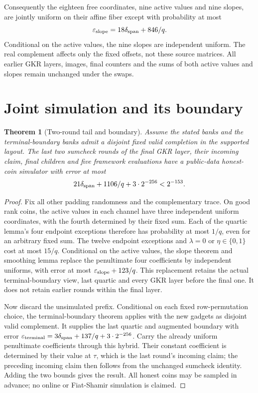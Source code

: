 \documentclass[11pt]{article}
\newtheorem{theorem}[lemma]{Theorem}
\begin{document}
Consequently the eighteen free coordinates, nine active values and nine slopes, are jointly uniform on their affine fiber except with probability at most
\[
 \varepsilon_{\rm slope}=18\delta_{\rm span}+846/q.
\]
Conditional on the active values, the nine slopes are independent uniform. The real complement affects only the fixed offsets, not these source matrices. All earlier GKR layers, images, final counters and the sums of both active values and slopes remain unchanged under the swaps.

\section{Joint simulation and its boundary}

\begin{theorem}[Two-round tail and boundary]
Assume the stated banks and the terminal-boundary banks admit a disjoint fixed valid completion in the supported layout. The last two sumcheck rounds of the final GKR layer, their incoming claim, final children and five framework evaluations have a public-data honest-coin simulator with error at most
\[
 21\delta_{\rm span}+1106/q+3\cdot2^{-256}<2^{-153}.
\]
\end{theorem}
\begin{proof}
Fix all other padding randomness and the complementary trace. On good rank coins, the active values in each channel have three independent uniform coordinates, with the fourth determined by their fixed sum. Each of the quartic lemma's four endpoint exceptions therefore has probability at most $1/q$, even for an arbitrary fixed sum. The twelve endpoint exceptions and $\lambda=0$ or $\eta\in\{0,1\}$ cost at most $15/q$. Conditional on the active values, the slope theorem and smoothing lemma replace the penultimate four coefficients by independent uniforms, with error at most $\varepsilon_{\rm slope}+123/q$. This replacement retains the actual terminal-boundary view, last quartic and every GKR layer before the final one. It does not retain earlier rounds within the final layer.

Now discard the unsimulated prefix. Conditional on each fixed row-permutation choice, the terminal-boundary theorem applies with the new gadgets as disjoint valid complement. It supplies the last quartic and augmented boundary with error $\varepsilon_{\rm terminal}=3\delta_{\rm span}+137/q+3\cdot2^{-256}$. Carry the already uniform penultimate coefficients through this hybrid. Their constant coefficient is determined by their value at $\tau$, which is the last round's incoming claim; the preceding incoming claim then follows from the unchanged sumcheck identity. Adding the two bounds gives the result. All honest coins may be sampled in advance; no online or Fiat-Shamir simulation is claimed.
\end{proof}
\end{document}
